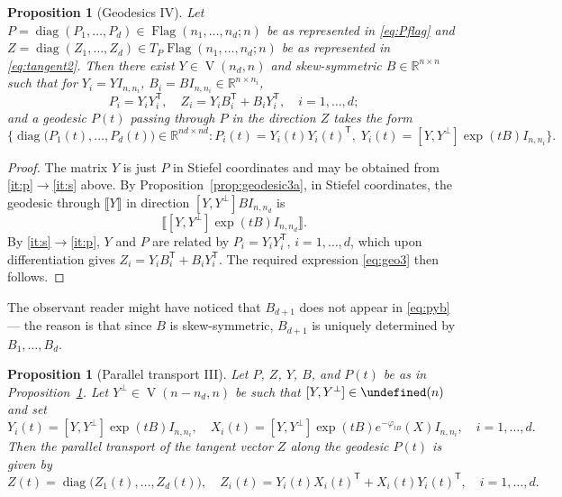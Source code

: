 \documentclass[11pt,reqno]{amsart}%
\newtheorem{proposition}[theorem]{Proposition}
\theoremstyle{definition}
\theoremstyle{remark}
\newcommand{\tp}{{\scriptscriptstyle\mathsf{T}}}
\newcommand{\lb}{\llbracket}
\newcommand{\rb}{\rrbracket}
\let\O\undefined
\DeclareMathOperator{\V}{V}
\DeclareMathOperator{\Flag}{Flag}
\DeclareMathOperator{\O}{O}
\DeclareMathOperator{\diag}{diag}
\begin{document}
\begin{proposition}[Geodesics IV]\label{prop:geodesics3}
Let $P = \diag(P_1,\dots,P_d) \in \Flag(n_1,\dots, n_d;n)$ be as represented in \eqref{eq:Pflag} and $Z = \diag(Z_1,\dots,Z_d)\in T_P\Flag(n_1,\dots, n_d;n)$ be as represented in  \eqref{eq:tangent2}. Then there exist  $Y \in \V(n_d, n)$ and skew-symmetric $B \in \mathbb{R}^{n \times n}$ such that for $Y_i = YI_{n,n_i}$, $B_i =BI_{n,n_i} \in \mathbb{R}^{n \times n_i}$,
\begin{equation}\label{eq:pyb}
P_i = Y_i Y_i^\tp, \quad Z_i = Y_i B_i^\tp + B_iY_i^\tp, \quad i=1,\dots,d;
\end{equation}
and a geodesic $P(t)$ passing through $P$ in the direction $Z$  takes the form
\begin{equation}\label{eq:geo3}
\{\diag \bigl(P_1(t),\dots, P_d(t)\bigr) \in \mathbb{R}^{nd \times nd} : P_i(t) = Y_i(t) Y_i(t)^\tp, \; Y_i(t) = [Y,Y^\perp] \exp(tB)I_{n,n_i}\}.
\end{equation}
\end{proposition}
\begin{proof}
The matrix $Y$ is just $P$ in Stiefel coordinates and may be obtained from \eqref{it:p}$\to$\eqref{it:s} above.  By Proposition~\ref{prop:geodesic3a}, in Stiefel coordinates, the geodesic through $\lb Y \rb$ in  direction $[Y,Y^{\perp}] B I_{n,n_d}$ is
\[
\lb [Y,Y^{\perp}]  \exp(tB) I_{n,n_d} \rb.
\]
By \eqref{it:s}$\to$\eqref{it:p},  $Y$ and $P$ are related by
$P_i = Y_iY_i^\tp$, $i=1,\dots,d$, which upon differentiation gives $Z_i = Y_i B_i^\tp + B_i Y_i^\tp$. The required expression \eqref{eq:geo3} then follows.
\end{proof}
The observant reader might have noticed that $B_{d+1}$ does not appear in \eqref{eq:pyb} --- the reason is that since $B$ is skew-symmetric, $B_{d+1}$ is uniquely determined by $B_1,\dots, B_d$. 
\begin{proposition}[Parallel transport III]\label{prop:pt1}
Let $P$, $Z$, $Y$, $B$,  and $P(t)$ be as in Proposition~\ref{prop:geodesics3}. Let $Y^\perp \in \V(n-n_d, n)$ be such that $[Y, Y^\perp] \in \O(n)$ and set
\begin{equation}\label{eq:geo4}
Y_i(t)=[Y, Y^\perp] \exp(tB)I_{n,n_i}, \quad X_i(t) = [Y, Y^\perp] \exp(tB)  e^{-\varphi_{tB}} ( X ) I_{n,n_i},  \quad i=1,\dots, d.
\end{equation}
Then the parallel transport of the tangent vector $Z$ along the geodesic $P(t)$ is given by 
\begin{equation}\label{eq:pt3}
Z(t) = \diag \bigl(Z_1(t),\dots, Z_d(t)\bigr),\quad Z_i(t) = Y_i(t) X_i(t)^\tp + X_i(t) Y_i(t)^\tp,\quad i=1,\dots, d.
\end{equation}
\end{proposition}
\end{document}
